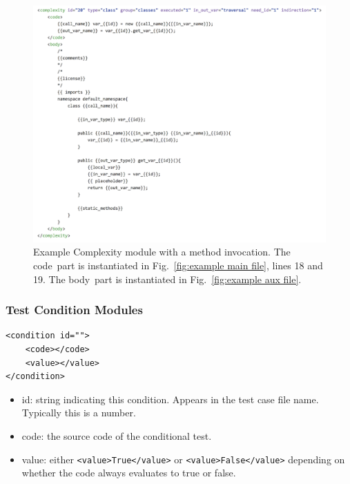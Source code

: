 \begin{figure}[tbph]
  \includegraphics[width=\linewidth]{fig_Complexity_file_method.png}
  \caption{Example Complexity module with a method invocation.
  The \texlangle code\texrangle\  part is instantiated in
  Fig.~\ref{fig:example main file}, lines 18 and 19.
  The \texlangle body\texrangle\  part is instantiated in
  Fig.~\ref{fig:example aux file}.}
  \label{fig:example complexity-method file}
\end{figure}

\subsubsection{Test Condition Modules}
\label{sec: condition modules}

\begin{verbatim}
<condition id="">
    <code></code>
    <value></value>
</condition>
\end{verbatim}

\begin{itemize}
    \item id: string indicating this condition.  Appears in the test case
      file name.  Typically this is a number.

    \item code: the source code of the conditional test.

    \item value: either \verb|<value>True</value>| or
        \verb|<value>False</value>| depending on \\
        whether the code always evaluates to true or false.
\end{itemize}


